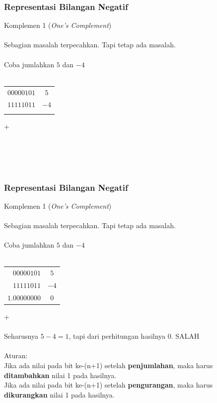 \documentclass{beamer}
\begin{document}

\begin{frame}
\frametitle{Representasi Bilangan Negatif}
Komplemen 1 (\textit{One's Complement})
\\\ \\Sebagian masalah terpecahkan. Tapi tetap ada masalah.
\\\ \\Coba jumlahkan $5$ dan $-4$
\\\ \\\begin{tabular}{rc}
	$00000101$ & $5$\\
	$11111011$ & $-4$\\
	\hline
	& \\
\end{tabular} +
\\\ \\\ \\\ \\\ \\ 
\end{frame}


\begin{frame}
\frametitle{Representasi Bilangan Negatif}
Komplemen 1 (\textit{One's Complement})
\\\ \\Sebagian masalah terpecahkan. Tapi tetap ada masalah.
\\\ \\Coba jumlahkan $5$ dan $-4$
\\\ \\\begin{tabular}{rc}
	$00000101$ & $5$\\
	$11111011$ & $-4$\\
	\hline
	$1.00000000$ & $0$\\
\end{tabular} +
\\\ \\Seharusnya $5-4=1$, tapi dari perhitungan hasilnya 0. SALAH 
\\\ \\Aturan: \\Jika ada nilai pada bit ke-(n+1) setelah \textbf{penjumlahan}, maka harus \textbf{ditambahkan} nilai 1 pada hasilnya.
\\Jika ada nilai pada bit ke-(n+1) setelah \textbf{pengurangan}, maka harus \textbf{dikurangkan} nilai 1 pada hasilnya.
\end{frame}
\end{document}
